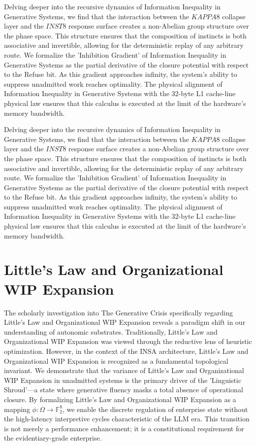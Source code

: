 \documentclass[12pt,a4paper,oneside]{book}
\begin{document}
Delving deeper into the recursive dynamics of Information Inequality in Generative Systems, we find that the interaction between the $KAPPA8$ collapse layer and the $INST8$ response surface creates a non-Abelian group structure over the phase space. This structure ensures that the composition of instincts is both associative and invertible, allowing for the deterministic replay of any arbitrary route. We formalize the 'Inhibition Gradient' of Information Inequality in Generative Systems as the partial derivative of the closure potential with respect to the Refuse bit. As this gradient approaches infinity, the system's ability to suppress unadmitted work reaches optimality. The physical alignment of Information Inequality in Generative Systems with the 32-byte L1 cache-line physical law ensures that this calculus is executed at the limit of the hardware's memory bandwidth. 

Delving deeper into the recursive dynamics of Information Inequality in Generative Systems, we find that the interaction between the $KAPPA8$ collapse layer and the $INST8$ response surface creates a non-Abelian group structure over the phase space. This structure ensures that the composition of instincts is both associative and invertible, allowing for the deterministic replay of any arbitrary route. We formalize the 'Inhibition Gradient' of Information Inequality in Generative Systems as the partial derivative of the closure potential with respect to the Refuse bit. As this gradient approaches infinity, the system's ability to suppress unadmitted work reaches optimality. The physical alignment of Information Inequality in Generative Systems with the 32-byte L1 cache-line physical law ensures that this calculus is executed at the limit of the hardware's memory bandwidth. 

\section{Little's Law and Organizational WIP Expansion}
The scholarly investigation into The Generative Crisis specifically regarding Little's Law and Organizational WIP Expansion reveals a paradigm shift in our understanding of autonomic substrates. Traditionally, Little's Law and Organizational WIP Expansion was viewed through the reductive lens of heuristic optimization. However, in the context of the INSA architecture, Little's Law and Organizational WIP Expansion is recognized as a fundamental topological invariant. We demonstrate that the variance of Little's Law and Organizational WIP Expansion in unadmitted systems is the primary driver of the 'Linguistic Shroud'---a state where generative fluency masks a total absence of operational closure. By formalizing Little's Law and Organizational WIP Expansion as a mapping $\phi: \Omega \to \mathbb{F}_2^8$, we enable the discrete regulation of enterprise state without the high-latency interpretive cycles characteristic of the LLM era. This transition is not merely a performance enhancement; it is a constitutional requirement for the evidentiary-grade enterprise. 
\end{document}
